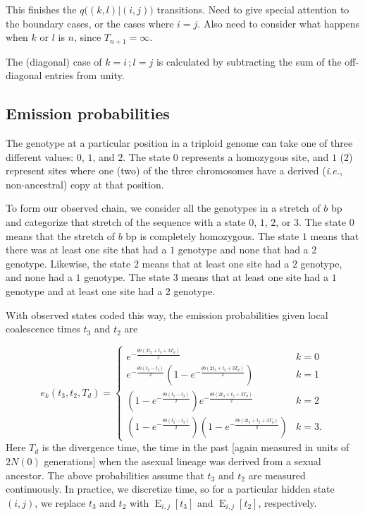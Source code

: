 \documentclass{article}
\DeclareMathOperator{\E}{E}
\begin{document}
This finishes the $q\big((k,l)|(i,j)\big)$ transitions. Need to give special
attention to the boundary cases, or the cases where $i=j$. Also need to
consider what happens when $k$ or $l$ is $n$, since $T_{n+1} = \infty$.

The (diagonal) case of $k=i\,;l=j$ is calculated by subtracting the sum of the
off-diagonal entries from unity.

\subsection{Emission probabilities}

The genotype at a particular position in a triploid genome can take one of
three different values: $0$, $1$, and $2$. The state $0$ represents a
homozygous site, and $1$ ($2$) represent sites where one (two) of the three
chromosomes have a derived (\emph{i.e.}, non-ancestral) copy at that position.

To form our observed chain, we consider all the genotypes in a stretch of $b$
bp and categorize that stretch of the sequence with a state $0$, $1$, $2$, or
$3$. The state $0$ means that the stretch of $b$ bp is completely homozygous.
The state $1$ means that there was at least one site that had a $1$ genotype
and none that had a $2$ genotype. Likewise, the state $2$ means that at least
one site had a $2$ genotype, and none had a $1$ genotype. The state $3$ means
that at least one site had a $1$ genotype and at least one site had a $2$
genotype.

With observed states coded this way, the emission probabilities given local
coalescence times $t_3$ and $t_2$ are

\begin{equation}
    e_k(t_3,t_2, T_d) =
    \begin{cases}
        e^{-\frac{\theta b \left(2t_2+t_3+3T_d\right)}{2}}&k=0\\
        e^{-\frac{\theta b \left(t_2-t_3\right)}{2}}\left(1-e^{-\frac{\theta b \left(2t_3+t_2+3T_d\right)}{2}}\right)&k=1\\
        \left(1-e^{-\frac{\theta b \left(t_2-t_3\right)}{2}}\right)e^{-\frac{\theta b \left(2t_3+t_2+3T_d\right)}{2}}&k=2\\
        \left(1-e^{-\frac{\theta b \left(t_2-t_3\right)}{2}}\right)\left(1-e^{-\frac{\theta b \left(2t_3+t_2+3T_d\right)}{2}}\right)&k=3.
    \end{cases}
    \label{eq:emissionprobs}
\end{equation}
Here $T_d$ is the divergence time, the time in the past [again measured in
units of $2N(0)$ generations] when the asexual lineage was derived from a
sexual ancestor. The above probabilities assume that $t_3$ and $t_2$ are
measured continuously. In practice, we discretize time, so for a particular
hidden state $(i,j)$, we replace $t_3$ and $t_2$ with $\E_{i,j}[t_3]$ and
$\E_{i,j}[t_2]$, respectively.
\end{document}
